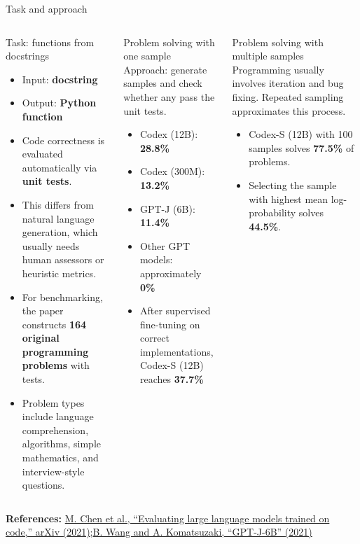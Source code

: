 \documentclass[aspectratio=43,9pt]{beamer}
\newcommand{\srclink}[2]{\href{#2}{\textcolor{black!68}{#1}}}
\newcommand{\sep}{;\hspace{0.35em}}
\newcommand{\refline}[2][References]{%
  \vfill
  {\raggedright\fontsize{5.1}{5.5}\selectfont\color{black!68}\textbf{#1:} #2\par}%
}
\newcommand{\srcChen}{\srclink{M. Chen et al., ``Evaluating large language models trained on code,'' arXiv (2021)}{https://arxiv.org/abs/2107.03374}}
\newcommand{\srcWang}{\srclink{B. Wang and A. Komatsuzaki, ``GPT-J-6B'' (2021)}{https://arankomatsuzaki.wordpress.com/2021/06/04/gpt-j/}}
\begin{document}
\begin{frame}{Task and approach}
\scriptsize
\begin{columns}[T,totalwidth=\textwidth]
\begin{block}{Task: functions from docstrings}
\begin{itemize}
  \item Input: \textbf{docstring}
  \item Output: \textbf{Python function}
  \item Code correctness is evaluated automatically via \textbf{unit tests}.
  \item This differs from natural language generation, which usually needs human assessors or heuristic metrics.
  \item For benchmarking, the paper constructs \textbf{164 original programming problems} with tests.
  \item Problem types include language comprehension, algorithms, simple mathematics, and interview-style questions.
\end{itemize}
\end{block}

\begin{block}{Problem solving with one sample}
Approach: generate samples and check whether any pass the unit tests.
\begin{itemize}
  \item Codex (12B): \textbf{28.8\%}
  \item Codex (300M): \textbf{13.2\%}
  \item GPT-J (6B): \textbf{11.4\%}
  \item Other GPT models: approximately \textbf{0\%}
  \item After supervised fine-tuning on correct implementations, Codex-S (12B) reaches \textbf{37.7\%}
\end{itemize}
\end{block}

\begin{exampleblock}{Problem solving with multiple samples}
Programming usually involves iteration and bug fixing. Repeated sampling approximates this process.
\begin{itemize}
  \item Codex-S (12B) with 100 samples solves \textbf{77.5\%} of problems.
  \item Selecting the sample with highest mean log-probability solves \textbf{44.5\%}.
\end{itemize}
\end{exampleblock}
\end{columns}

\refline{\srcChen\sep \srcWang}
\end{frame}
\end{document}
